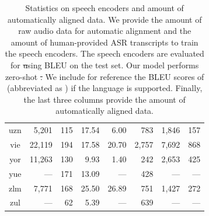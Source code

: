 \begin{table}[!htb]
\begin{tabular}{@{}crrrrrrr@{}}
uzn  &  5,201 &  115 &  17.54 &   6.00 &  783 &  1,846 &  157\\
vie  &  22,119 &  194 &  17.58 &  20.70 &  2,757 &  7,692 &  868\\
yor  &  11,263 &  130 &   9.93 &   1.40 &  242 &  2,653 &  425\\
yue  &   ---  &  171 &  13.09 &   ---  &  428 &   ---  &   --- \\
zlm  &  7,771 &  168 &  25.50 &  26.89 &  751 &  1,427 &  272\\
zul  &   ---  &  62 &   5.39 &   ---  &  639 &   ---  &   --- \\
       \bottomrule
    \end{tabular}
     \caption{Statistics on speech encoders and amount of automatically aligned data. 
    We provide the amount of raw audio data for automatic alignment and the amount of human-provided ASR transcripts to train the speech encoders. 
    The speech encoders are evaluated for \st using BLEU on the \fleurs test set. Our model performs zero-shot \st.
    We include for reference the BLEU scores of \whisperlarge (abbreviated as \whisperlargeabbr) if the language is supported.
    Finally, the last three columns provide the amount of automatically aligned data.}\label{offline:data:stats2}
\end{table}
\restoregeometry